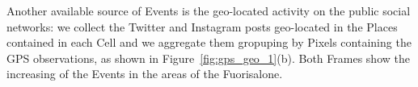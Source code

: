Another available source of \textsf{Event}s is the geo-located activity on the public social networks: we collect the Twitter and Instagram posts geo-located in the \textsf{Place}s contained in each \textsf{Cell} and we aggregate them gropuping by \textsf{Pixel}s containing the GPS observations, as shown in Figure~\ref{fig:gps_geo_1}(b).
Both \textsf{Frame}s show the increasing of the \textsf{Event}s in the areas of the Fuorisalone.

\begin{figure}[p]
\centering
{}\\
\end{figure}
